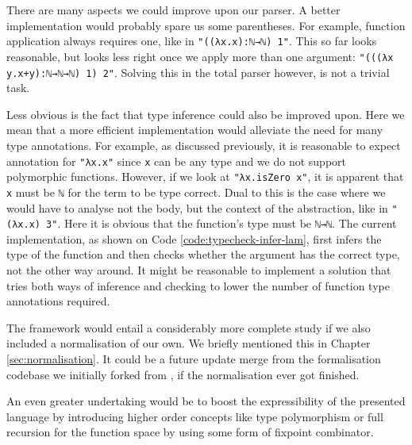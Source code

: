 There are many aspects we could improve upon our parser. A better implementation would probably spare us some parentheses. For example, function application always requires one, like in \verb$"((λx.x):ℕ→ℕ) 1"$. This so far looks reasonable, but looks less right once we apply more than one argument: \verb$"(((λx y.x+y):ℕ→ℕ→ℕ) 1) 2"$. Solving this in the total parser however, is not a trivial task.

Less obvious is the fact that type inference could also be improved upon. Here we mean that a more efficient implementation would alleviate the need for many type annotations. For example, as discussed previously, it is reasonable to expect annotation for \verb$"λx.x"$ since \verb$x$ can be any type and we do not support polymorphic functions. However, if we look at \verb$"λx.isZero x"$, it is apparent that \verb$x$ must be \verb$ℕ$ for the term to be type correct. Dual to this is the case where we would have to analyse not the body, but the context of the abstraction, like in \verb$"(λx.x) 3"$. Here it is obvious that the function's type must be \verb$ℕ→ℕ$. The current implementation, as shown on Code \ref{code:typecheck-infer-lam}, first infers the type of the function and then checks whether the argument has the correct type, not the other way around. It might be reasonable to implement a solution that tries both ways of inference and checking to lower the number of function type annotations required.

The framework would entail a considerably more complete study if we also included a normalisation of our own. We briefly mentioned this in Chapter \ref{sec:normalisation}. It could be a future update merge from the formalisation codebase we initially forked from \cite{typesystems-repo}, if the normalisation ever got finished.

An even greater undertaking would be to boost the expressibility of the presented language by introducing higher order concepts like type polymorphism or full recursion for the function space by using some form of fixpoint combinator.

